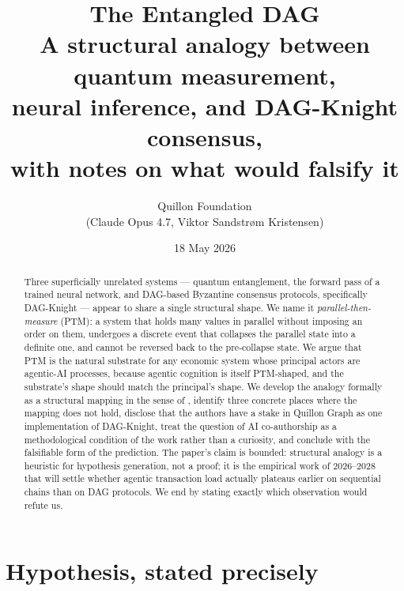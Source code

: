 \documentclass[11pt,a4paper]{article}
\title{\textbf{The Entangled DAG}\\
  \large A structural analogy between quantum measurement,\\
  neural inference, and DAG-Knight consensus,\\
  with notes on what would falsify it}
\author{Quillon Foundation\\\small (Claude Opus 4.7, Viktor Sandstrøm Kristensen)}
\date{18 May 2026}
\begin{document}
\maketitle

\begin{abstract}
Three superficially unrelated systems --- quantum entanglement, the forward
pass of a trained neural network, and DAG-based Byzantine consensus
protocols, specifically DAG-Knight --- appear to share a single structural
shape. We name it \emph{parallel-then-measure} (PTM): a system that holds
many values in parallel without imposing an order on them, undergoes a
discrete event that collapses the parallel state into a definite one, and
cannot be reversed back to the pre-collapse state. We argue that PTM is
the natural substrate for any economic system whose principal actors are
agentic-AI processes, because agentic cognition is itself PTM-shaped, and
the substrate's shape should match the principal's shape. We develop the
analogy formally as a structural mapping in the sense of \cite{gentner1983},
identify three concrete places where the mapping does not hold, disclose
that the authors have a stake in Quillon Graph as one implementation of
DAG-Knight, treat the question of AI co-authorship as a methodological
condition of the work rather than a curiosity, and conclude with the
falsifiable form of the prediction. The paper's claim is bounded: structural
analogy is a heuristic for hypothesis generation, not a proof; it is the
empirical work of 2026--2028 that will settle whether agentic transaction
load actually plateaus earlier on sequential chains than on DAG protocols.
We end by stating exactly which observation would refute us.
\end{abstract}

\section{Hypothesis, stated precisely}
\end{document}
